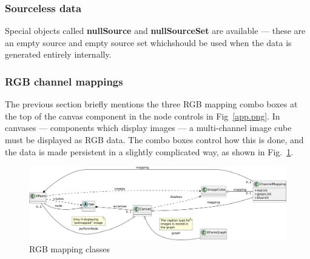 \subsubsection{Sourceless data}
Special objects called \textbf{nullSource} and \textbf{nullSourceSet} are available --- these are an empty source and empty
source set whichshould be used when the data is generated entirely internally.

\subsubsection{RGB channel mappings}
The previous section briefly mentions the three RGB mapping combo boxes at the
top of the canvas component in the node controls in Fig~\ref{app.png}. In
canvases --- components which display images --- a multi-channel image cube
must be displayed as RGB data. The combo boxes control how this is done, and
the data is made persistent in a slightly complicated way, as shown in Fig.~\ref{rgb.pdf}.

\begin{figure}[ht]
\center
\includegraphics[width=6in]{rgb.pdf}
\caption{RGB mapping classes}
\label{rgb.pdf}
\end{figure}

